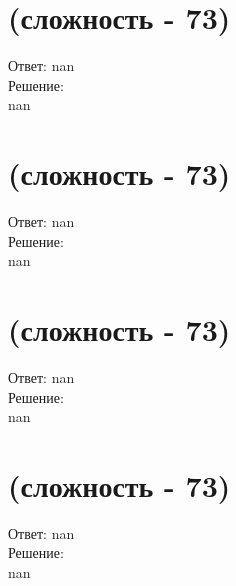 \documentclass[a4paper,11pt]{article}%
\begin{document}
%
\section{(сложность {-} 73)}%
\label{sec:( {-} 73)}%
\hspace{3ex} Ответ: nan \\%
%
\hspace*{3ex} Решение: \\%
nan

%
\section{(сложность {-} 73)}%
\label{sec:( {-} 73)}%
\hspace{3ex} Ответ: nan \\%
%
\hspace*{3ex} Решение: \\%
nan

%
\section{(сложность {-} 73)}%
\label{sec:( {-} 73)}%
\hspace{3ex} Ответ: nan \\%
%
\hspace*{3ex} Решение: \\%
nan

%
\section{(сложность {-} 73)}%
\label{sec:( {-} 73)}%
\hspace{3ex} Ответ: nan \\%
%
\hspace*{3ex} Решение: \\%
nan

%
\end{document}
